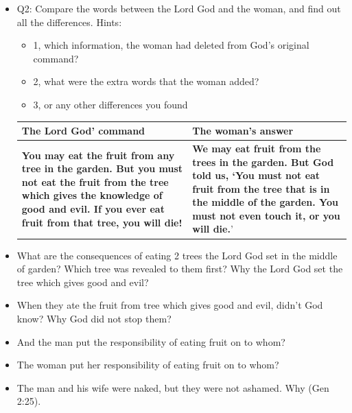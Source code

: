 \begin{itemize}
\item Q2: Compare the words between the Lord God and the woman, and find out all the differences. Hints:
\begin{itemize}
\item 1, which information, the woman had deleted from God's original command?
\item 2, what were the extra words that the woman added?
\item 3, or any other differences you found
\end{itemize}
\begin{table}[H]
\centering 
\begin{tabular}{p{}|p{8.5cm}}\hline\hline
The Lord God' command&The woman's answer\\\hline
\textbf{You may eat the fruit from any tree in the garden. But you must not eat the fruit from the tree which gives the knowledge of good and evil. If you ever eat fruit from that tree, you will die!}
&\textbf{We may eat fruit from the trees in the garden. But God told us, ‘You must not eat fruit from the tree that is in the middle of the garden. You must not even touch it, or you will die.}’\\\hline
\end{tabular}
\end{table}

\item What are the consequences of eating 2 trees the Lord God set in the middle of garden? Which tree was revealed to them first? Why the Lord God set the tree which gives good and evil?
\item When they ate the fruit from tree which gives good and evil, didn't God know? Why God did not stop them?
\item And the man put the responsibility of eating fruit on to whom?
\item The woman put her responsibility of eating fruit on to whom?
\item The man and his wife were naked, but they were not ashamed. Why  (Gen 2:25).

\end{itemize}















